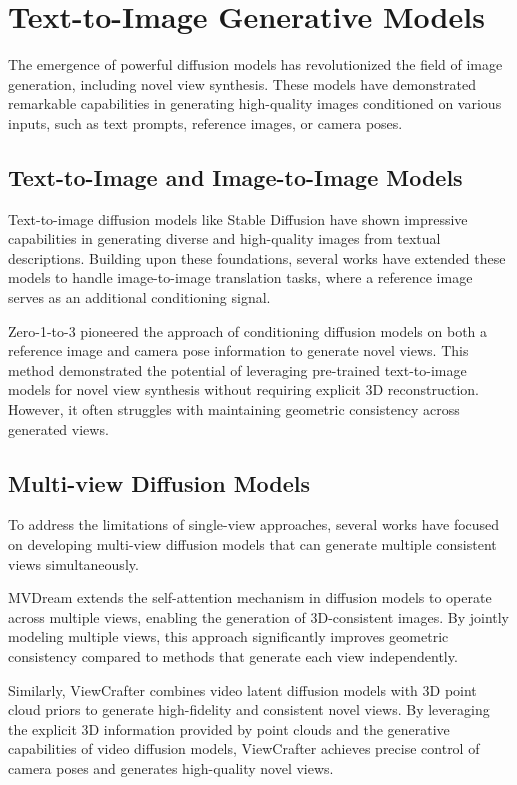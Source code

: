 \section{Text-to-Image Generative Models}\label{sec:text-to-image}

The emergence of powerful diffusion models has revolutionized the field of image generation, including novel view synthesis. These models have demonstrated remarkable capabilities in generating high-quality images conditioned on various inputs, such as text prompts, reference images, or camera poses.


\subsection{Text-to-Image and Image-to-Image Models}

Text-to-image diffusion models like Stable Diffusion \cite{stablediffusion} have shown impressive capabilities in generating diverse and high-quality images from textual descriptions. Building upon these foundations, several works have extended these models to handle image-to-image translation tasks, where a reference image serves as an additional conditioning signal.

Zero-1-to-3 \cite{zero1to3} pioneered the approach of conditioning diffusion models on both a reference image and camera pose information to generate novel views. This method demonstrated the potential of leveraging pre-trained text-to-image models for novel view synthesis without requiring explicit 3D reconstruction. However, it often struggles with maintaining geometric consistency across generated views.


\subsection{Multi-view Diffusion Models}

To address the limitations of single-view approaches, several works have focused on developing multi-view diffusion models that can generate multiple consistent views simultaneously.

MVDream \cite{mvdream} extends the self-attention mechanism in diffusion models to operate across multiple views, enabling the generation of 3D-consistent images. By jointly modeling multiple views, this approach significantly improves geometric consistency compared to methods that generate each view independently.

Similarly, ViewCrafter \cite{viewcrafter} combines video latent diffusion models \cite{videolatentdiffusion} with 3D point cloud priors to generate high-fidelity and consistent novel views. By leveraging the explicit 3D information provided by point clouds and the generative capabilities of video diffusion models, ViewCrafter achieves precise control of camera poses and generates high-quality novel views.

